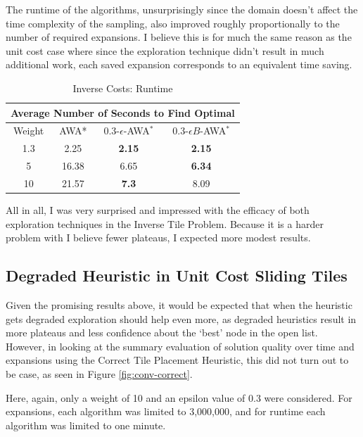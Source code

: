 The runtime of the algorithms, unsurprisingly since the domain doesn't affect the time complexity of the sampling, also improved roughly proportionally to the number of required expansions. I believe this is for much the same reason as the unit cost case where since the exploration technique didn't result in much additional work, each saved expansion corresponds to an equivalent time saving. 

\begin{table}
\def\arraystretch{1.3}
\begin{tabular}{ |c||c|c|c|  }
    \hline
    \multicolumn{4}{|c|}{Average Number of Seconds to Find Optimal} \\
    \hline
    Weight& AWA* & $0.3$-$\epsilon$-AWA$^*$ & $0.3$-$\epsilon B$-AWA$^*$\\
    \hline
    1.3 & 2.25 & \textbf{2.15} & \textbf{2.15} \\
    \hline
    5 & 16.38 & 6.65 & \textbf{6.34} \\
    \hline
    10& 21.57 & \textbf{7.3} & 8.09 \\
    \hline
\end{tabular}
\caption{Inverse Costs: Runtime}\label{tab:inv-avg-time}
\end{table}

All in all, I was very surprised and impressed with the efficacy of both exploration techniques in the Inverse Tile Problem. Because it is a harder problem with I believe fewer plateaus, I expected more modest results. 

\subsection{Degraded Heuristic in Unit Cost Sliding Tiles}
Given the promising results above, it would be expected that when the heuristic gets degraded exploration should help even more, as degraded heuristics result in more plateaus and less confidence about the `best' node in the open list. However, in looking at the summary evaluation of solution quality over time and expansions using the Correct Tile Placement Heuristic, this did not turn out to be case, as seen in Figure \ref{fig:conv-correct}.

Here, again, only a weight of 10 and an epsilon value of 0.3 were considered. For expansions, each algorithm was limited to 3,000,000, and for runtime each algorithm was limited to one minute. 

